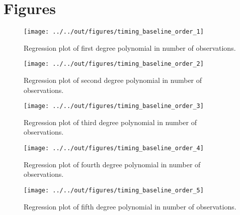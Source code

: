 \documentclass[11pt, a4paper, leqno]{article}
\begin{document}
\section{Figures} %
\label{sec:Figures}


\begin{figure}[H]
    \caption{Regression plot of first degree polynomial in number of observations.}
    
    \texttt{[image: ../../out/figures/timing\_baseline\_order\_1]}

\end{figure}


\begin{figure}[H]
    \caption{Regression plot of second degree polynomial in number of observations.}
    
    \texttt{[image: ../../out/figures/timing\_baseline\_order\_2]}
\end{figure}


\begin{figure}[H]
    \caption{Regression plot of third degree polynomial in number of observations.}
    
    \texttt{[image: ../../out/figures/timing\_baseline\_order\_3]}

\end{figure}


\begin{figure}[H]
    \caption{Regression plot of fourth degree polynomial in number of observations.}
    
    \texttt{[image: ../../out/figures/timing\_baseline\_order\_4]}

\end{figure}


\begin{figure}[H]
    \caption{Regression plot of fifth degree polynomial in number of observations.}
    
    \texttt{[image: ../../out/figures/timing\_baseline\_order\_5]}

\end{figure}

\clearpage







\end{document}
